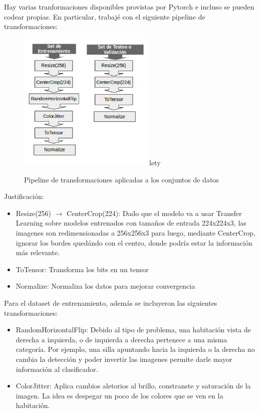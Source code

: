 \documentclass{article}
\begin{document}
Hay varias tranformaciones disponibles provistas por Pytorch e incluso se pueden codear propias. En particular, trabajé con el siguiente pipeline de transformaciones:

\begin{figure}[H]
  \begin{center}
    \includegraphics[width=250px]{img/transformaciones.png}lety
    \caption{ Pipeline de transformaciones aplicadas a los conjuntos de datos }
    \label{conn}
  \end{center}
\end{figure}


Justificación: 

\begin{itemize}
  \item Resize(256) $\rightarrow$ CenterCrop(224): Dado que el modelo va a usar Transfer Learning sobre modelos entrenados con tamaños de entrada 224x224x3, las imagenes son redimensionadas a 256x256x3 para luego, mediante CenterCrop, ignorar los bordes quedándo con el centro, donde podría estar la información más relevante. 
  \item ToTensor: Transforma los bits en un tensor
  \item Normalize: Normaliza los datos para mejorar convergencia  
\end{itemize}

Para el dataset de entrenamiento, además se incluyeron las siguientes transformaciones:

\begin{itemize}
  \item RandomHorizontalFlip: Debido al tipo de problema, una habitación vista de derecha a izquierda, o de izquierda a derecha pertenece a una misma categoría. Por ejemplo, una silla apuntando hacia la izquierda o la derecha no cambia la detección y poder invertir las imagenes permite darle mayor información al clasificador. 
  \item ColorJitter: Aplica cambios aletorios al brillo, constranste y saturación de la imagen. La idea es despegar un poco de los colores que se ven en la habitación. 
\end{itemize}
\end{document}
